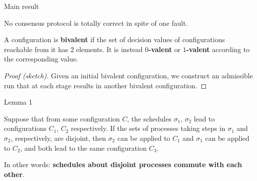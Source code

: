 \documentclass[12pt]{beamer}
\begin{document}
  \begin{frame}{Main result}
    \begin{theorem}
      No consensus protocol is totally correct in spite of one fault.
    \end{theorem}

    \vspace{0.25cm}

    A configuration is \textbf{bivalent} if the set of decision values of configurations reachable from it has \(2\) elements. It is instead \textbf{\(0\)-valent} or \textbf{\(1\)-valent} according to the corresponding value.

    \vspace{0.25cm}

    \begin{proof}[Proof (sketch)]
      Given an initial bivalent configuration, we construct an admissible run that at each stage results in another bivalent configuration.
    \end{proof}
  \end{frame}

  \begin{frame}{Lemma 1}
    \begin{lemma}
      Suppose that from some configuration \(C\), the schedules \(\sigma_1\), \(\sigma_2\) lead to configurations \(C_1\), \(C_2\) respectively. If the sets of processes taking steps in \(\sigma_1\) and \(\sigma_2\), respectively, are disjoint, then \(\sigma_2\) can be applied to \(C_1\) and \(\sigma_1\) can be applied to \(C_2\), and both lead to the same configuration \(C_3\).
    \end{lemma}

    \vspace{0.25cm}

    In other words: \textbf{schedules about disjoint processes commute with each other}.
  \end{frame}
\end{document}
